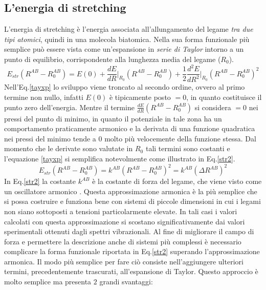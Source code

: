 \documentclass[oneside]{amsbook}
\numberwithin{section}{chapter}
\numberwithin{equation}{section}
\numberwithin{figure}{section}
\begin{document}
\subsection{L'energia di stretching } L'energia di stretching è l'energia associata all'allungamento del legame \emph{tra due tipi atomici}, quindi in una molecola biatomica. Nella sua forma funzionale più semplice può essere vista come un'espansione in \emph{serie di Taylor } intorno a un punto di equilibrio, corrispondente alla lunghezza media del legame ($R_0$). 
\begin{equation}
\label{tayxp}
 E_{str}(R^{AB}-R^{AB}_0)= E(0)+   \frac{d E}{d R} \biggr \rvert_{R_0} (R^{AB}-R_0^{AB})+\frac{1}{2}\frac{d^2E}{dR^2} \biggr \rvert_{R_0} (R^{AB}-R_0^{AB})^2
\end{equation} 
Nell'Eq.\ref{tayxp} lo sviluppo viene troncato al secondo ordine, ovvero al primo termine non nullo, infatti $E(0)$ è tipicamente posto $=0$, in quanto costituisce il punto zero dell'energia. Mentre il termine $\frac{d E}{d R}  (R^{AB}-R_0^{AB})$ si considera $=0$ nei pressi del punto di minimo, in quanto il potenziale in tale zona ha un comportamento praticamente armonico e la derivata di una funzione quadratica nei pressi del minimo tende a $0$ molto più velocemente della funzione stessa.
Dal momento che le derivate sono valutate in $R_0$ tali termini sono costanti e l'equazione \ref{tayxp} si semplifica notevolmente come illustrato in Eq.\ref{str2}.
\begin{equation}
\label{str2}
E_{str}(R^{AB}-R^{AB}_0)=k^{AB}(R^{AB}-R_0^{AB})^2=k^{AB}(\Delta R^{AB})^2
\end{equation}
In Eq.\ref{str2} la costante $k^{AB}$ è la costante di forza del legame, che viene visto come un oscillatore armonico . Questa approssimazione armonica è la più semplice che si possa costruire e funziona bene con sistemi di piccole dimensioni in cui i legami non siano sottoposti a tensioni particolarmente elevate. In tali casi i valori calcolati con questa approssimazione si scostano significativamente dai valori sperimentali ottenuti dagli spettri vibrazionali.
Al fine di migliorare il campo di forza e permettere la descrizione anche di sistemi più complessi è necessario complicare la forma funzionale riportata in Eq.\ref{str2} superando l'approssimazione armonica.
Il modo più semplice per fare ciò consiste nell'aggiungere ulteriori termini, precedentemente trascurati, all'espansione di Taylor. Questo approccio è molto semplice ma presenta $2$ grandi svantaggi:
\end{document}
